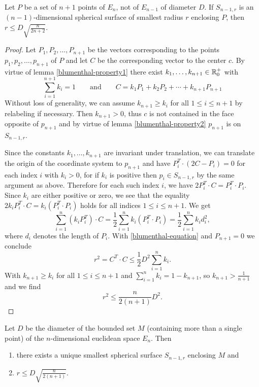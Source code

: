 \begin{lemma}\label{lem:blumenthal-lem3}
	Let $P$ be a set of $n+1$ points of $E_n$, not of $E_{n-1}$ of diameter $D$. If $S_{n-1,r}$ is an $(n-1)$-dimensional spherical surface of smallest radius $r$ enclosing $P$, then $r\leq D\sqrt{\frac{n}{2n+2}}$.
\end{lemma}

\begin{proof}
	Let $P_1, P_2,\dots, P_{n+1}$ be the vectors corresponding to the points $p_1,p_2,\dots,p_{n+1}$ of $P$ and let $C$ be the corresponding vector to the center $c$. By virtue of lemma \ref{blumenthal-property1} there exist $k_1,\dots,k_{n+1}\in\mathbb{R}^+_0$ with
	\begin{equation}\label{blumenthal-equation}
	\sum_{i=1}^{n+1}k_i=1\qquad\text{and}\qquad C=k_1P_1+k_2P_2+\cdots+k_{n+1}P_{n+1}
	\end{equation}
	Without loss of generality, we can assume $k_{n+1}\geq k_i$ for all $1\leq i\leq n+1$ by relabeling if necessary. Then $k_{n+1}>0$, thus $c$ is not contained in the face opposite of $p_{n+1}$ and by virtue of lemma \ref{blumenthal-property2} $p_{n+1}$ is on $S_{n-1,r}$.
	
	Since the constants $k_1,\dots, k_{n+1}$ are invariant under translation, we can translate the origin of the coordinate system to $p_{n+1}$ and have $P_i^T\cdot (2C-P_i)=0$ for each index $i$ with $k_i>0$, for if $k_i$ is positive then $p_i\in S_{n-1,r}$ by the same argument as above. Therefore for each such index $i$, we have $2P_i^T\cdot C=P_i^T\cdot P_i$.
	Since $k_i$ are either positive or zero, we see that the equality $2k_iP_i^T\cdot C=k_i(P_i^T\cdot P_i)$ holds for all indices $1\leq i\leq n+1$. We get
	\[
	\sum_{i=1}^{n}(k_iP_i^T)\cdot C=\frac{1}{2}\sum_{i=1}^nk_i(P_i^T\cdot P_i)=\frac{1}{2}\sum_{i=1}^{n}k_id_i^2,
	\]
	where $d_i$ denotes the length of $P_i$. With \eqref{blumenthal-equation} and $P_{n+1}=0$ we conclude 
	\[
	r^2=C^T\cdot C\leq \frac{1}{2}D^2\sum_{i=1}^{n}k_i.
	\]
	With $k_{n+1}\geq k_i$ for all $1\leq i\leq n+1$ and $\sum_{i=1}^{n}k_i=1-k_{n+1}$, so $k_{n+1}>\frac{1}{n+1}$ and we find \[
	r^2\leq \frac{n}{2(n+1)}D^2.
	\]
\end{proof}

\begin{theorem}\label{thm:blumenthal}
	Let $D$ be the diameter of the bounded set $M$ (containing more than a single point) of the $n$-dimensional euclidean space $E_n$. Then 
	\begin{enumerate}
		\item there exists a unique smallest spherical surface $S_{n-1,r}$ enclosing $M$ and
		\item $r\leq D\sqrt{\frac{n}{2(n+1)}}$.\label{statement:blumenthal2}
	\end{enumerate}
\end{theorem}

